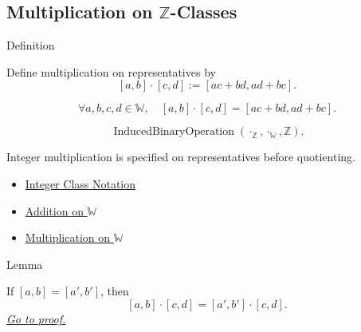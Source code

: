 \subsection*{\texorpdfstring{Multiplication on $\mathbb{Z}$-Classes}{Multiplication on Z-Classes}}

\begin{definitionbox}{Definition}
\begin{definition}
\label{def:multiplication-on-z-classes}
Define multiplication on representatives by
\[
[a,b]\cdot[c,d]:=[ac+bd,ad+bc].
\]
\end{definition}
\end{definitionbox}

\begin{remark*}
\[
\forall a,b,c,d\in\mathbb{W},\quad
[a,b]\cdot[c,d]=[ac+bd,ad+bc].
\]
\end{remark*}

\begin{remark*}
\[
\operatorname{InducedBinaryOperation}(\cdot_{\mathbb{Z}},\cdot_{\mathbb{W}},\mathbb{Z}).
\]
\end{remark*}

\begin{remark*}[Interpretation]
Integer multiplication is specified on representatives before quotienting.
\end{remark*}

\begin{dependencies}
\begin{itemize}
  \item \hyperref[def:integer-class-notation]{Integer Class Notation}
  \item \hyperref[def:addition-on-w]{Addition on $\mathbb{W}$}
  \item \hyperref[def:multiplication-on-w]{Multiplication on $\mathbb{W}$}
\end{itemize}
\end{dependencies}

\begin{lemmabox}{Lemma}
\begin{lemma}
\label{lem:multiplication-on-z-classes-respects-left-equivalence}
If $[a,b]=[a',b']$, then
\[
[a,b]\cdot[c,d]=[a',b']\cdot[c,d].
\]
\hyperref[prf:multiplication-on-z-classes-respects-left-equivalence]{\textit{Go to proof.}}
\end{lemma}
\end{lemmabox}

